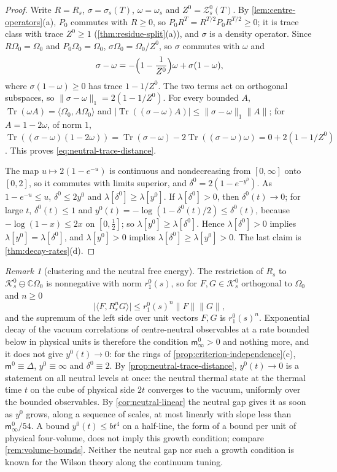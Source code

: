 \documentclass[11pt,a4paper]{amsart}
\theoremstyle{definition}
\theoremstyle{remark}
\newtheorem{remark}[theorem]{Remark}
\numberwithin{equation}{section}
\DeclareMathOperator{\Tr}{Tr}        %
\newcommand{\C}{\mathbb{C}}          %
\newcommand{\Kspace}{\mathcal{K}}    %
\newcommand{\ip}[2]{\langle #1,#2\rangle}  %
\newcommand{\norm}[1]{\lVert #1\rVert}     %
\newcommand{\abs}[1]{\lvert #1\rvert}      %
\newcommand{\TT}{\mathbb{T}}               %
\newcommand{\Zc}{\mathcal{Z}}              %
\newcommand{\Omegazero}{\Omega_0}          %
\begin{document}
\begin{proof}
Write $R=R_s$, $\sigma=\sigma_s(T)$, $\omega=\omega_s$ and $Z^0=\Zc^0_s(T)$. By \cref{lem:centre-operators}\textup{(a)}, $P_0$ commutes with $R\ge0$, so $P_0R^T=R^{T/2}P_0R^{T/2}\ge0$; it is trace class with trace $Z^0\ge1$ (\cref{thm:residue-split}\textup{(a)}), and $\sigma$ is a density operator. Since $R\Omegazero=\Omegazero$ and $P_0\Omegazero=\Omegazero$, $\sigma\Omegazero=\Omegazero/Z^0$, so $\sigma$ commutes with $\omega$ and
\[
\sigma-\omega=-\Bigl(1-\frac1{Z^0}\Bigr)\omega+\sigma(1-\omega),
\]
where $\sigma(1-\omega)\ge0$ has trace $1-1/Z^0$. The two terms act on orthogonal subspaces, so $\norm{\sigma-\omega}_1=2(1-1/Z^0)$. For every bounded $A$, $\Tr(\omega A)=\ip{\Omegazero}{A\Omegazero}$ and $\abs{\Tr((\sigma-\omega)A)}\le\norm{\sigma-\omega}_1\norm A$; for $A=1-2\omega$, of norm $1$, $\Tr((\sigma-\omega)(1-2\omega))=\Tr(\sigma-\omega)-2\Tr((\sigma-\omega)\omega)=0+2(1-1/Z^0)$. This proves \eqref{eq:neutral-trace-distance}.

The map $u\mapsto2(1-e^{-u})$ is continuous and nondecreasing from $[0,\infty]$ onto $[0,2]$, so it commutes with limits superior, and $\delta^0=2(1-e^{-y^0})$. As $1-e^{-u}\le u$, $\delta^0\le2y^0$ and $\lambda[\delta^0]\ge\lambda[y^0]$. If $\lambda[\delta^0]>0$, then $\delta^0(t)\to0$; for large $t$, $\delta^0(t)\le1$ and $y^0(t)=-\log(1-\delta^0(t)/2)\le\delta^0(t)$, because $-\log(1-x)\le2x$ on $[0,\frac12]$; so $\lambda[y^0]\ge\lambda[\delta^0]$. Hence $\lambda[\delta^0]>0$ implies $\lambda[y^0]=\lambda[\delta^0]$, and $\lambda[y^0]>0$ implies $\lambda[\delta^0]\ge\lambda[y^0]>0$. The last claim is \cref{thm:decay-rates}\textup{(d)}.
\end{proof}

\begin{remark}[clustering and the neutral free energy]\label{rem:neutral-clustering}
The restriction of $R_s$ to $\Kspace^0_s\ominus\C\Omegazero$ is nonnegative with norm $r_1^0(s)$, so for $F,G\in\Kspace^0_s$ orthogonal to $\Omegazero$ and $n\ge0$
\[
\abs{\ip F{R_s^nG}}\le r_1^0(s)^n\norm F\norm G,
\]
and the supremum of the left side over unit vectors $F,G$ is $r_1^0(s)^n$. Exponential decay of the vacuum correlations of centre-neutral observables at a rate bounded below in physical units is therefore the condition $\mathsf m^0_\infty>0$ and nothing more, and it does not give $y^0(t)\to0$: for the rings of \cref{prop:criterion-independence}\textup{(c)}, $\mathsf m^0\equiv\Delta$, $y^0\equiv\infty$ and $\delta^0\equiv2$. By \cref{prop:neutral-trace-distance}, $y^0(t)\to0$ is a statement on all neutral levels at once: the neutral thermal state at the thermal time $t$ on the cube of physical side $2t$ converges to the vacuum, uniformly over the bounded observables. By \cref{cor:neutral-linear} the neutral gap gives it as soon as $y^0$ grows, along a sequence of scales, at most linearly with slope less than $\mathsf m^0_\infty/54$. A bound $y^0(t)\le bt^4$ on a half-line, the form of a bound per unit of physical four-volume, does not imply this growth condition; compare \cref{rem:volume-bounds}. Neither the neutral gap nor such a growth condition is known for the Wilson theory along the continuum tuning.
\end{remark}
\end{document}
